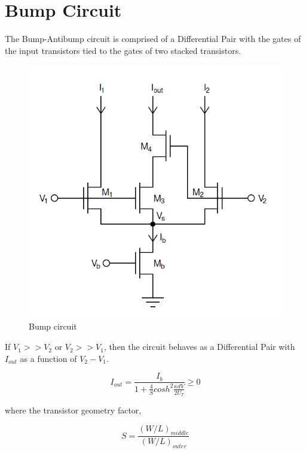 \documentclass[main]{subfiles}
\begin{document}

\section{Bump Circuit}


The Bump-Antibump circuit is comprised of a Differential Pair with the gates of the input transistors tied to the gates of two stacked transistors. 

\begin{figure}[htbp]
  \centering
  \includegraphics[scale=0.7]{figs/Bump-Antibump_circuit.png}
  \caption{Bump circuit}
  \label{fig:Bump-Antibump_circuit}
\end{figure}

If $V_1 >> V_2$ or $V_2 >> V_1$, then the circuit behaves as a Differential Pair with $I_{out}$ as a function of $V_2 -V_1$.

\begin{equation}
I_{out} = \frac{I_b}{1+\frac{4}{S}cosh^2 \frac{\kappa dV}{2U_T}} \geq 0
\end{equation}

where the transistor geometry factor, 

\begin{equation}
S = \frac{(W/L)_{middle}}{(W/L)_{outer}}
\end{equation}
\end{document}
